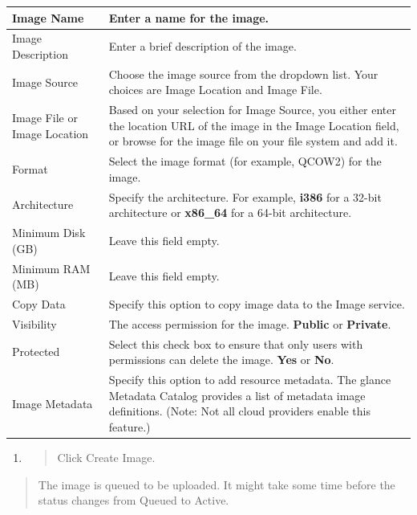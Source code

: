 \begin{center}
	\begin{tabular}{ l p{} }
	Image Name & Enter a name for the image.\\ \hline
	Image Description & Enter a brief description of the image.\\ \hline
	Image Source & Choose the image source from the dropdown list. Your
	choices are Image Location and Image File.\\ \hline
	Image File or Image Location & Based on your selection for Image Source,
	you either enter the location URL of the image in the Image Location
	field, or browse for the image file on your file system and add it.\\ \hline
	Format & Select the image format (for example, QCOW2) for the image.\\ \hline
	Architecture & Specify the architecture. For example, \textbf{i386} for
	a 32-bit architecture or \textbf{x86\_64} for a 64-bit architecture.\\ \hline
	Minimum Disk (GB) & Leave this field empty.\\ \hline
	Minimum RAM (MB) & Leave this field empty.\\ \hline
	Copy Data & Specify this option to copy image data to the Image service.\\ \hline
	Visibility & The access permission for the image. \textbf{Public} or
	\textbf{Private}.\\ \hline
	Protected & Select this check box to ensure that only users with
	permissions can delete the image. \textbf{Yes} or
	\textbf{No}.\\ \hline
	Image Metadata & Specify this option to add resource metadata. The
	glance Metadata Catalog provides a list of metadata image definitions.
	(Note: Not all cloud providers enable this feature.)\\
	\end{tabular}
\end{center}


\begin{enumerate}
\def\labelenumi{\arabic{enumi}.}
\item
  \begin{quote}
  Click Create Image.
  \end{quote}
\end{enumerate}

\begin{quote}
The image is queued to be uploaded. It might take some time before the
status changes from Queued to Active.
\end{quote}

